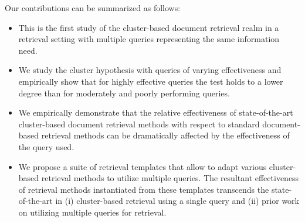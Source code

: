 Our contributions can be summarized as follows:
\begin{itemize}
\item This is the first study of the cluster-based document retrieval
realm in a retrieval setting with multiple queries representing the
same information need.
\item We study the cluster hypothesis with queries of varying
effectiveness and empirically show that for highly effective queries
the test holds to a lower degree than for moderately and poorly
performing queries.
\item We empirically demonstrate that the relative effectiveness of
state-of-the-art cluster-based document retrieval methods with
respect to standard document-based retrieval methods can be
dramatically affected by the effectiveness of the query used.
\item We propose a suite of retrieval templates that allow to adapt
various cluster-based retrieval methods to utilize multiple queries.
The resultant effectiveness of retrieval methods instantiated from
these templates transcends the state-of-the-art in (i) cluster-based
retrieval using a single query and (ii) prior work on utilizing
multiple queries for retrieval.
\end{itemize}

